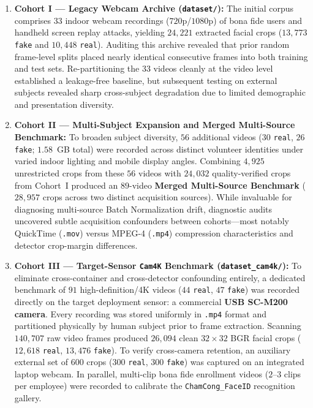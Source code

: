 \begin{enumerate}
    \item \textbf{Cohort I --- Legacy Webcam Archive (\texttt{dataset/}):} The initial corpus comprises $33$ indoor webcam recordings ($720$p/$1080$p) of bona fide users and handheld screen replay attacks, yielding $24{,}221$ extracted facial crops ($13{,}773$ \texttt{fake} and $10{,}448$ \texttt{real}). Auditing this archive revealed that prior random frame-level splits placed nearly identical consecutive frames into both training and test sets. Re-partitioning the $33$ videos cleanly at the video level established a leakage-free baseline, but subsequent testing on external subjects revealed sharp cross-subject degradation due to limited demographic and presentation diversity.
    \item \textbf{Cohort II --- Multi-Subject Expansion and Merged Multi-Source Benchmark:} To broaden subject diversity, $56$ additional videos ($30$ \texttt{real}, $26$ \texttt{fake}; $1.58$~GB total) were recorded across distinct volunteer identities under varied indoor lighting and mobile display angles. Combining $4{,}925$ unrestricted crops from these $56$ videos with $24{,}032$ quality-verified crops from Cohort~I produced an $89$-video \textbf{Merged Multi-Source Benchmark} ($28{,}957$ crops across two distinct acquisition sources). While invaluable for diagnosing multi-source Batch Normalization drift, diagnostic audits uncovered subtle acquisition confounders between cohorts---most notably QuickTime (\texttt{.mov}) versus MPEG-4 (\texttt{.mp4}) compression characteristics and detector crop-margin differences.
    \item \textbf{Cohort III --- Target-Sensor \texttt{Cam4K} Benchmark (\texttt{dataset\_cam4k/}):} To eliminate cross-container and cross-detector confounding entirely, a dedicated benchmark of $91$ high-definition/4K videos ($44$ \texttt{real}, $47$ \texttt{fake}) was recorded directly on the target deployment sensor: a commercial \textbf{USB SC-M200 camera}. Every recording was stored uniformly in \texttt{.mp4} format and partitioned physically by human subject prior to frame extraction. Scanning $140{,}707$ raw video frames produced $26{,}094$ clean $32\times32$ BGR facial crops ($12{,}618$ \texttt{real}, $13{,}476$ \texttt{fake}). To verify cross-camera retention, an auxiliary external set of $600$ crops ($300$ \texttt{real}, $300$ \texttt{fake}) was captured on an integrated laptop webcam. In parallel, multi-clip bona fide enrollment videos ($2$--$3$ clips per employee) were recorded to calibrate the \texttt{ChamCong\_FaceID} recognition gallery.
\end{enumerate}

